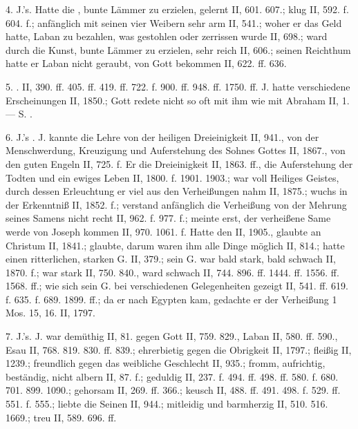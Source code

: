 4.  J.’s. Hatte die , bunte Lämmer zu erzielen, gelernt II, 601. 607.;  klug II, 592. f. 604. f.; anfänglich mit seinen vier Weibern sehr arm II, 541.; woher er das Geld hatte, Laban zu bezahlen, was gestohlen oder zerrissen wurde II, 698.; ward durch die Kunst, bunte Lämmer zu erzielen, sehr reich II, 606.; seinen Reichthum hatte er Laban nicht geraubt, von Gott bekommen II, 622. ff. 636.

5. . II, 390. ff. 405. ff. 419. ff. 722. f. 900. ff. 948. ff. 1750. ff. J. hatte verschiedene Erscheinungen II, 1850.; Gott redete nicht so oft mit ihm wie mit Abraham II, 1. — S. .

6. J.’s . J. kannte die Lehre von der heiligen Dreieinigkeit II, 941., von der Menschwerdung, Kreuzigung und Auferstehung des Sohnes Gottes II, 1867., von den guten Engeln II, 725. f. Er  die Dreieinigkeit II, 1863. ff., die Auferstehung der Todten und ein ewiges Leben II, 1800. f. 1901. 1903.; war voll Heiliges Geistes, durch dessen Erleuchtung er viel aus den Verheißungen nahm II, 1875.; wuchs in der Erkenntniß II, 1852. f.; verstand anfänglich die Verheißung von der Mehrung seines Samens nicht recht II, 962. f. 977. f.; meinte erst, der verheißene Same werde von Joseph kommen II, 970. 1061. f. Hatte den  II, 1905., glaubte an Christum II, 1841.; glaubte, darum waren ihm alle Dinge möglich II, 814.; hatte einen ritterlichen, starken G. II, 379.; sein G. war bald stark, bald schwach II, 1870. f.; war stark II, 750. 840., ward schwach II, 744. 896. ff. 1444. ff. 1556. ff. 1568. ff.; wie sich sein G. bei verschiedenen Gelegenheiten gezeigt II, 541. ff. 619. f. 635. f. 689. 1899. ff.; da er nach Egypten kam, gedachte er der Verheißung 1 Mos. 15, 16. II, 1797.

7.  J.’s. J. war demüthig II, 81. gegen Gott II, 759. 829., Laban II, 580. ff. 590., Esau II, 768. 819. 830. ff. 839.; ehrerbietig gegen die Obrigkeit II, 1797.; fleißig II, 1239.; freundlich gegen das weibliche Geschlecht II, 935.; fromm, aufrichtig, beständig, nicht albern II, 87. f.; geduldig II, 237. f. 494. ff. 498. ff. 580. f. 680. 701. 899. 1090.; gehorsam II, 269. ff. 366.; keusch II, 488. ff. 491. 498. f. 529. ff. 551. f. 555.; liebte die Seinen II, 944.; mitleidig und barmherzig II, 510. 516. 1669.; treu II, 589. 696. ff.

